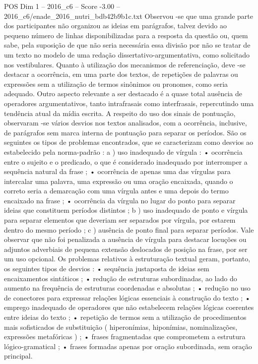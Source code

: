 \begin{textsample}{POS Dim 1 – 2016\_c6 – Score -3.00 – 2016\_c6/enade\_2016\_nutri\_bdb42b9b1c.txt}
Observou -se que uma grande parte dos participantes não organizou as ideias em parágrafos, talvez devido ao pequeno número de linhas disponibilizadas para a resposta da questão ou, quem sabe, pela suposição de que não seria necessária essa divisão por não se tratar de um texto no modelo de uma redação dissertativo-argumentativa, como solicitado nos vestibulares.
Quanto à utilização dos mecanismos de referenciação, deve -se destacar a ocorrência, em uma parte dos textos, de repetições de palavras ou expressões sem a utilização de termos sinônimos ou pronomes, como seria adequado.
Outro aspecto relevante a ser destacado é a quase total ausência de operadores argumentativos, tanto intrafrasais como interfrasais, repercutindo uma tendência atual da mídia escrita.
A respeito do uso dos sinais de pontuação, observaram -se vários desvios nos textos analisados, com a ocorrência, inclusive, de parágrafos sem marca interna de pontuação para separar os períodos.
São os seguintes os tipos de problemas encontrados, que se caracterizam como desvios ao estabelecido pela norma-padrão : a ) uso inadequado de vírgula : • ocorrência entre o sujeito e o predicado, o que é considerado inadequado por interromper a sequência natural da frase ; • ocorrência de apenas uma das vírgulas para intercalar uma palavra, uma expressão ou uma oração encaixada, quando o correto seria a demarcação com uma vírgula antes e uma depois do termo encaixado na frase ; • ocorrência da vírgula no lugar do ponto para separar ideias que constituem períodos distintos ; b ) uso inadequado de ponto e vírgula para separar elementos que deveriam ser separados por vírgula, por estarem dentro do mesmo período ; c ) ausência de ponto final para separar períodos.
Vale observar que não foi penalizada a ausência de vírgula para destacar locuções ou adjuntos adverbiais de pequena extensão deslocados de posição na frase, por ser um uso opcional.
Os problemas relativos à estruturação textual geram, portanto, os seguintes tipos de desvios : • sequência justaposta de ideias sem encaixamentos sintáticos ; • redução de estruturas subordinadas, ao lado do aumento na frequência de estruturas coordenadas e absolutas ; • redução no uso de conectores para expressar relações lógicas essenciais à construção do texto ; • emprego inadequado de operadores que não estabelecem relações lógicas coerentes entre ideias do texto ; • repetição de termos sem a utilização de procedimentos mais sofisticados de substituição ( hiperonímias, hiponímias, nominalizações, expressões metafóricas ) ; • frases fragmentadas que comprometem a estrutura lógico-gramatical ; • frases formadas apenas por oração subordinada, sem oração principal.

\end{textsample}
